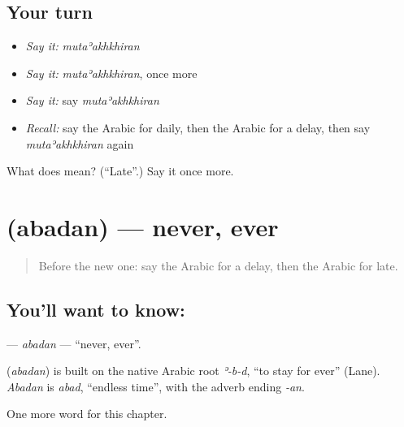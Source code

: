 \subsection*{Your turn}
\begin{itemize}
\raggedright
  \item \emph{Say it:} \emph{mutaʾakhkhiran}
  \item \emph{Say it:} \emph{mutaʾakhkhiran}, once more
  \item \emph{Say it:} say \emph{mutaʾakhkhiran}
  \item \emph{Recall:} say the Arabic for daily, then the Arabic for a delay, then say \emph{mutaʾakhkhiran} again
\end{itemize}

\begin{tcolorbox}[breakable,colback=teal!4,colframe=teal!35!black,title={Before you move on}]
What does  mean? (\textquotedblleft{}Late\textquotedblright{}.) Say it once more.
\end{tcolorbox}
\section[\texorpdfstring{\ar{أبدا} (abadan)}{أبدا (abadan)}]{ (abadan) — never, ever}

\label{lesson:AR-C170-abadan}



\begin{quote}
Before the new one: say the Arabic for a delay, then the Arabic for late.
\end{quote}

\subsection*{You'll want to know: }
\textbf{} — \emph{abadan} — \textquotedblleft{}never, ever\textquotedblright{}.

\begin{cousinweb}
\textbf{} (\emph{abadan}) is built on the native Arabic root \emph{ʾ-b-d}, \textquotedblleft{}to stay for ever\textquotedblright{} (Lane). \emph{Abadan} is \emph{abad}, \textquotedblleft{}endless time\textquotedblright{}, with the adverb ending \emph{-an}.
\end{cousinweb}

\begin{grammarlens}[title={What you've built}]
One more word for this chapter.
\end{grammarlens}

